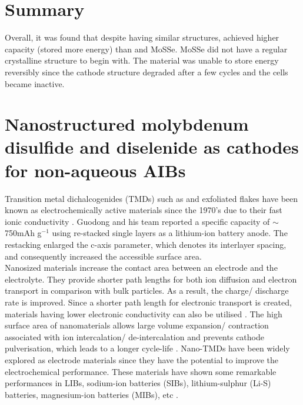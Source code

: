\section{Summary}
Overall, it was found that despite having similar structures,  achieved higher capacity (stored more energy) than  and MoSSe. MoSSe did not have a regular crystalline structure to begin with. The material was unable to store energy reversibly since the cathode structure degraded after a few cycles and the cells became inactive.  

\newpage
\section{Nanostructured molybdenum disulfide and diselenide as cathodes for non-aqueous AIBs} \label{nanmol}
Transition metal dichalcogenides (TMDs) such as  and exfoliated  flakes have been known as electrochemically active materials since the 1970's due to their fast ionic conductivity \cite{du_superior_2010,whittingham_electrical_1976}. Guodong and his team reported a specific capacity of $\sim$750mAh g$^{-1}$ using re-stacked  single layers as a lithium-ion battery anode. The restacking enlarged the c-axis parameter, which denotes its interlayer spacing, and consequently increased the accessible surface area.\\
Nanosized materials increase the contact area between an electrode and the electrolyte. They provide shorter path lengths for both ion diffusion and electron transport in comparison with bulk particles. As a result, the charge/ discharge rate is improved. Since a shorter path length for electronic transport is created, materials having lower electronic conductivity can also be utilised \cite{pitchai_nanostructured_2011}. The high surface area of nanomaterials allows large volume expansion/ contraction associated with ion intercalation/ de-intercalation and prevents cathode pulverisation, which leads to a longer cycle-life \cite{zhang_ultrathin_2015, cong_intrinsic_2015}. Nano-TMDs have been widely explored as electrode materials since they have the potential to improve the electrochemical performance. 
These materials have shown some remarkable performances in LIBs, sodium-ion batteries (SIBs), lithium-sulphur (Li-S) batteries, magnesium-ion batteries (MIBs), etc \cite{xie_mos2/graphene_2015,cao_preparation_2013,dong_insights_2019,li_rechargeable_2018}.\\
